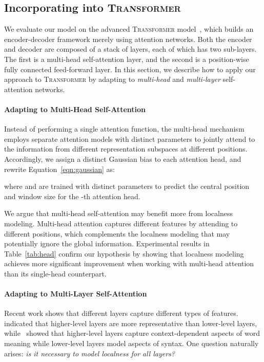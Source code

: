 \documentclass[11pt,a4paper]{article}
\begin{document}
\subsection{Incorporating into \textsc{Transformer}}
\label{sec:trans}

We evaluate our model on the advanced \textsc{Transformer} model~\cite{Vaswani:2017:NIPS}, which builds an encoder-decoder framework merely using attention networks.
Both the encoder and decoder are composed of a stack of  layers, each of which has two sub-layers.
The first is a multi-head self-attention layer, and the second is a position-wise fully connected feed-forward layer. In this section, we describe how to apply our approach to \textsc{Transformer} by adapting to {\em multi-head} and {\em multi-layer} self-attention networks.


\paragraph{Adapting to Multi-Head Self-Attention}
Instead of performing a single attention function, the multi-head mechanism employs  separate attention models with distinct parameters to jointly attend to the information from different representation subspaces at different positions.
Accordingly, we assign a distinct Gaussian bias to each attention head, and rewrite Equation~\ref{eqn:gaussian} as:

where  and  are trained with distinct parameters to predict the central position and window size for the -th attention head. 

We argue that multi-head self-attention may benefit more from localness modeling. Multi-head attention captures different features by attending to different positions, which complements the localness modeling that may potentially ignore the global information. Experimental results in Table~\ref{tab:head} confirm our hypothesis by showing that localness modeling achieves more significant improvement when working with multi-head attention than its single-head counterpart.



\paragraph{Adapting to Multi-Layer Self-Attention}
Recent work shows that different layers capture different types of features.
~ indicated that higher-level layers are more representative than lower-level layers, while~ showed that higher-level layers capture context-dependent aspects of word meaning while lower-level layers model aspects of syntax. 
One question naturally arises: {\em is it necessary to model localness for all layers?}
\end{document}
